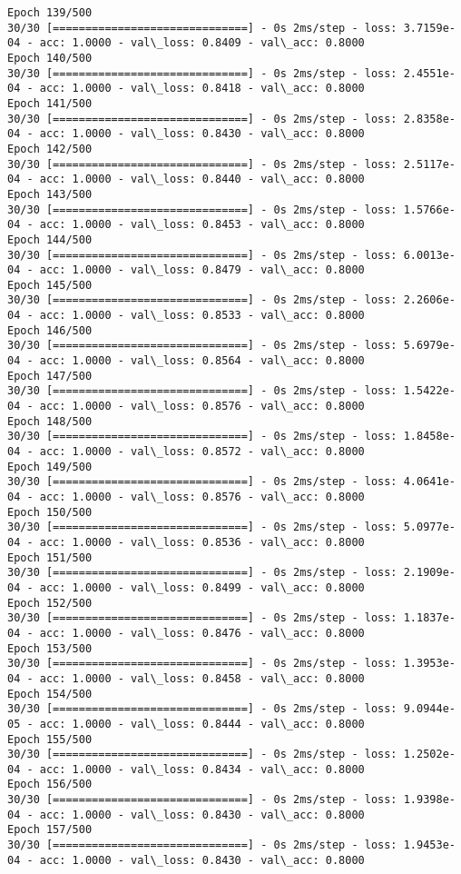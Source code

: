 \documentclass[11pt]{article}
\begin{document}
\begin{Verbatim}[commandchars=\\\{\}]
Epoch 139/500
30/30 [==============================] - 0s 2ms/step - loss: 3.7159e-04 - acc: 1.0000 - val\_loss: 0.8409 - val\_acc: 0.8000
Epoch 140/500
30/30 [==============================] - 0s 2ms/step - loss: 2.4551e-04 - acc: 1.0000 - val\_loss: 0.8418 - val\_acc: 0.8000
Epoch 141/500
30/30 [==============================] - 0s 2ms/step - loss: 2.8358e-04 - acc: 1.0000 - val\_loss: 0.8430 - val\_acc: 0.8000
Epoch 142/500
30/30 [==============================] - 0s 2ms/step - loss: 2.5117e-04 - acc: 1.0000 - val\_loss: 0.8440 - val\_acc: 0.8000
Epoch 143/500
30/30 [==============================] - 0s 2ms/step - loss: 1.5766e-04 - acc: 1.0000 - val\_loss: 0.8453 - val\_acc: 0.8000
Epoch 144/500
30/30 [==============================] - 0s 2ms/step - loss: 6.0013e-04 - acc: 1.0000 - val\_loss: 0.8479 - val\_acc: 0.8000
Epoch 145/500
30/30 [==============================] - 0s 2ms/step - loss: 2.2606e-04 - acc: 1.0000 - val\_loss: 0.8533 - val\_acc: 0.8000
Epoch 146/500
30/30 [==============================] - 0s 2ms/step - loss: 5.6979e-04 - acc: 1.0000 - val\_loss: 0.8564 - val\_acc: 0.8000
Epoch 147/500
30/30 [==============================] - 0s 2ms/step - loss: 1.5422e-04 - acc: 1.0000 - val\_loss: 0.8576 - val\_acc: 0.8000
Epoch 148/500
30/30 [==============================] - 0s 2ms/step - loss: 1.8458e-04 - acc: 1.0000 - val\_loss: 0.8572 - val\_acc: 0.8000
Epoch 149/500
30/30 [==============================] - 0s 2ms/step - loss: 4.0641e-04 - acc: 1.0000 - val\_loss: 0.8576 - val\_acc: 0.8000
Epoch 150/500
30/30 [==============================] - 0s 2ms/step - loss: 5.0977e-04 - acc: 1.0000 - val\_loss: 0.8536 - val\_acc: 0.8000
Epoch 151/500
30/30 [==============================] - 0s 2ms/step - loss: 2.1909e-04 - acc: 1.0000 - val\_loss: 0.8499 - val\_acc: 0.8000
Epoch 152/500
30/30 [==============================] - 0s 2ms/step - loss: 1.1837e-04 - acc: 1.0000 - val\_loss: 0.8476 - val\_acc: 0.8000
Epoch 153/500
30/30 [==============================] - 0s 2ms/step - loss: 1.3953e-04 - acc: 1.0000 - val\_loss: 0.8458 - val\_acc: 0.8000
Epoch 154/500
30/30 [==============================] - 0s 2ms/step - loss: 9.0944e-05 - acc: 1.0000 - val\_loss: 0.8444 - val\_acc: 0.8000
Epoch 155/500
30/30 [==============================] - 0s 2ms/step - loss: 1.2502e-04 - acc: 1.0000 - val\_loss: 0.8434 - val\_acc: 0.8000
Epoch 156/500
30/30 [==============================] - 0s 2ms/step - loss: 1.9398e-04 - acc: 1.0000 - val\_loss: 0.8430 - val\_acc: 0.8000
Epoch 157/500
30/30 [==============================] - 0s 2ms/step - loss: 1.9453e-04 - acc: 1.0000 - val\_loss: 0.8430 - val\_acc: 0.8000

\end{Verbatim}
\end{document}
